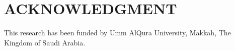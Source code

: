 \documentclass[letterpaper, 10 pt, conference]{ieeeconf}  %
\begin{document}








\section*{ACKNOWLEDGMENT}

This research has been funded by Umm AlQura University, Makkah, The Kingdom of Saudi Arabia.






\end{document}
